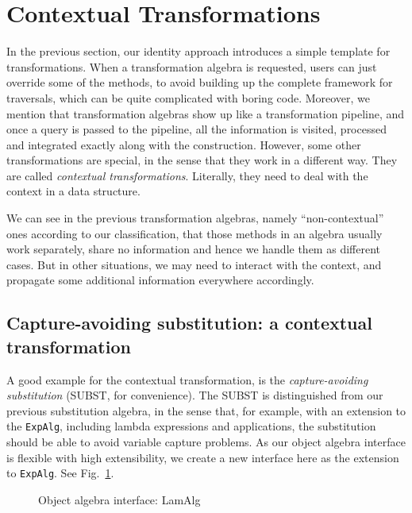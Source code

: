 \section{Contextual Transformations}\label{sec:contexttrans}

In the previous section, our identity approach introduces a simple template for transformations. When a transformation algebra is requested, users can just override some of the methods, to avoid building up the complete framework for traversals, which can be quite complicated with boring code. Moreover, we mention that transformation algebras show up like a transformation pipeline, and once a query is passed to the pipeline, all the information is visited, processed and integrated exactly along with the construction. However, some other transformations are special, in the sense that they work in a different way. They are called \textit{contextual transformations}. Literally, they need to deal with the context in a data structure.

We can see in the previous transformation algebras, namely ``non-contextual'' ones according to our classification, that those methods in an algebra usually work separately, share no information and hence we handle them as different cases. But in other situations, we may need to interact with the context, and propagate some additional information everywhere accordingly.

\subsection{Capture-avoiding substitution: a contextual transformation}\label{subsec:captureavoidsubst}

A good example for the contextual transformation, is the \textit{capture-avoiding substitution} (SUBST, for convenience).  The SUBST is distinguished from our previous substitution algebra, in the sense that, for example, with an extension to the \lstinline{ExpAlg}, including lambda expressions and applications, the substitution should be able to avoid variable capture problems. As our object algebra interface is flexible with high extensibility, we create a new interface here as the extension to \lstinline{ExpAlg}. See Fig.~\ref{lam_alg}.

\begin{figure}[!htbp]
\vspace{-.1in}
\caption{Object algebra interface: LamAlg}
\label{lam_alg}
\end{figure}

